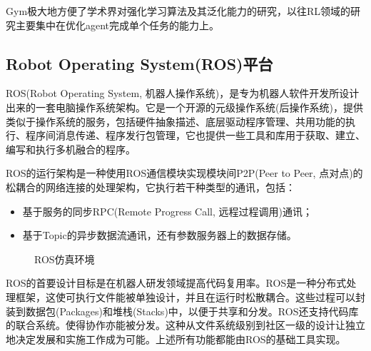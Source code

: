 \documentclass[bachelor]{thesis-uestc}
\begin{document}
	Gym极大地方便了学术界对强化学习算法及其泛化能力的研究，以往RL领域的研究主要集中在优化agent完成单个任务的能力上。
	
	\subsection{Robot Operating System(ROS)平台}
	ROS(Robot Operating System, 机器人操作系统)，是专为机器人软件开发所设计出来的一套电脑操作系统架构。它是一个开源的元级操作系统(后操作系统)，提供类似于操作系统的服务，包括硬件抽象描述、底层驱动程序管理、共用功能的执行、程序间消息传递、程序发行包管理，它也提供一些工具和库用于获取、建立、编写和执行多机融合的程序。
	
	ROS的运行架构是一种使用ROS通信模块实现模块间P2P(Peer to Peer, 点对点)的松耦合的网络连接的处理架构，它执行若干种类型的通讯，包括：
	\begin{itemize}
		\item 基于服务的同步RPC(Remote Progress Call, 远程过程调用)通讯；
		\item 基于Topic的异步数据流通讯，还有参数服务器上的数据存储。
	\end{itemize}
	\begin{figure}[h]
		\centering
		\caption{ROS仿真环境}
	\end{figure}

	ROS的首要设计目标是在机器人研发领域提高代码复用率。ROS是一种分布式处理框架，这使可执行文件能被单独设计，并且在运行时松散耦合。这些过程可以封装到数据包(Packages)和堆栈(Stacks)中，以便于共享和分发。ROS还支持代码库的联合系统。使得协作亦能被分发。这种从文件系统级别到社区一级的设计让独立地决定发展和实施工作成为可能。上述所有功能都能由ROS的基础工具实现。
	
\end{document}
